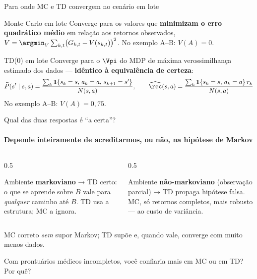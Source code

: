 \documentclass[aspectratio=169, 11pt]{beamer}
\newcommand{\Phat}{\widehat{P}}
\newcommand{\rhat}{\widehat{\rec}}
\begin{document}
\begin{frame}{Para onde MC e TD convergem no cenário em lote}

  \begin{teobox}{Monte Carlo em lote}
    Converge para os valores que \textbf{minimizam o erro quadrático médio}
    em relação aos retornos observados,
    $V = \argmin_{V} \sum_{k,t} \bigl(G_{k,t} - V(s_{k,t})\bigr)^2$.
    No exemplo A--B: $V(A) = 0$.
  \end{teobox}

  \begin{teobox}{TD(0) em lote}
    Converge para o $\Vpi$ do MDP de máxima verossimilhança estimado dos
    dados --- \textbf{idêntico à equivalência de certeza}:
    {\small
    \[
      \Phat(s' \mid s,a) = \frac{\sum_{k} \mathbf{1}\{s_k=s,\,a_k=a,\,s_{k+1}=s'\}}{N(s,a)},
      \qquad
      \rhat(s,a) = \frac{\sum_{k} \mathbf{1}\{s_k=s,\,a_k=a\}\,r_k}{N(s,a)}
    \]}
    \vspace{-0.7em}
    No exemplo A--B: $V(A) = 0{,}75$.
  \end{teobox}
\end{frame}

\begin{frame}{Qual das duas respostas é ``a certa''?}
  \framesubtitle{Depende inteiramente de acreditarmos, ou não, na hipótese de Markov}

  \begin{columns}[T]
    \begin{column}{0.5\textwidth}
      \begin{ideiabox}
        Ambiente \textbf{markoviano} → TD certo: o que se aprende sobre $B$
        vale para \emph{qualquer} caminho até $B$. TD usa a estrutura; MC
        a ignora.
      \end{ideiabox}
    \end{column}
    \begin{column}{0.5\textwidth}
      \begin{alertabox}
        Ambiente \textbf{não-markoviano} (observação parcial) → TD propaga
        hipótese falsa. MC, só retornos completos, mais robusto — ao custo
        de variância.
      \end{alertabox}
    \end{column}
  \end{columns}

  \smallskip
  {\small MC correto \emph{sem} supor Markov; TD supõe e, quando vale,
  converge com muito menos dados.}

  \vspace{-0.4em}
  \begin{quizbox}{}
    Com prontuários médicos incompletos, você confiaria mais em MC ou em
    TD? Por quê?
  \end{quizbox}

\end{frame}
\end{document}
